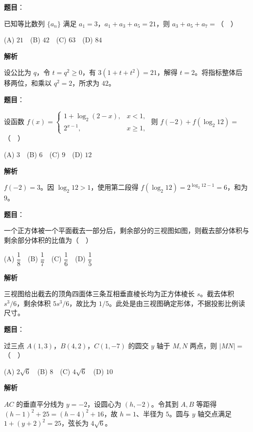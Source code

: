 \begin{answer}

\textbf{题目}：

已知等比数列 $\{a_n\}$ 满足 $a_1=3$，$a_1+a_3+a_5=21$，则 $a_3+a_5+a_7=$（　）

(A) $21$　(B) $42$　(C) $63$　(D) $84$

\textbf{解析}

设公比为 $q$，令 $t=q^2\ge0$，有 $3(1+t+t^2)=21$，解得 $t=2$。将指标整体后移两位，和乘以 $q^2=2$，所求为 $42$。


\end{answer}
\begin{answer}

\textbf{题目}：

设函数
$\displaystyle f(x)=\begin{cases}1+\log_2(2-x),&x<1,\\2^{x-1},&x\geqslant1,\end{cases}$
则 $f(-2)+f(\log_2 12)=$（　）

(A) $3$　(B) $6$　(C) $9$　(D) $12$

\textbf{解析}

$f(-2)=3$。因 $\log_2 12>1$，使用第二段得 $f(\log_2 12)=2^{\log_2 12-1}=6$，和为 $9$。


\end{answer}
\begin{answer}

\textbf{题目}：

一个正方体被一个平面截去一部分后，剩余部分的三视图如图，则截去部分体积与剩余部分体积的比值为（　）
\nopagebreak[4]
\begin{center}\end{center}
\nopagebreak[4]
(A) $\dfrac18$　(B) $\dfrac17$　(C) $\dfrac16$　(D) $\dfrac15$

\textbf{解析}

三视图给出截去的顶角四面体三条互相垂直棱长均为正方体棱长 $s$。截去体积 $s^3/6$，剩余体积 $5s^3/6$，故比为 $1/5$。此处是由三视图确定形体，不据投影比例读尺寸。


\end{answer}
\begin{answer}

\textbf{题目}：

过三点 $A(1,3)$，$B(4,2)$，$C(1,-7)$ 的圆交 $y$ 轴于 $M,N$ 两点，则 $|MN|=$（　）

(A) $2\sqrt6$　(B) $8$　(C) $4\sqrt6$　(D) $10$

\textbf{解析}

$AC$ 的垂直平分线为 $y=-2$，设圆心为 $(h,-2)$。令其到 $A,B$ 等距得 $(h-1)^2+25=(h-4)^2+16$，故 $h=1$、半径为 $5$。圆与 $y$ 轴交点满足 $1+(y+2)^2=25$，弦长为 $4\sqrt6$。


\end{answer}

